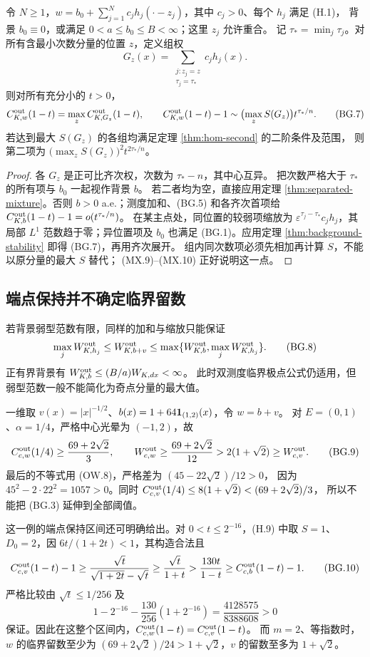 \begin{corollary}[允许奇点重合的有限混合权]\label{cor:grouped-singularities}
令 $N\ge1$，$w=b_0+\sum_{j=1}^N c_jh_j(\cdot-z_j)$，其中 $c_j>0$、每个 $h_j$ 满足 (H.1)，
背景 $b_0\equiv0$，或满足 $0<a\le b_0\le B<\infty$；这里 $z_j$ 允许重合。
记 $\tau_* =\min_j\tau_j$。对所有含最小次数分量的位置 $z$，定义组权
\[G_z(x)=\sum_{\substack{j:z_j=z\\\tau_j=\tau_*}}c_jh_j(x).
\tag{BG.6}\]
则对所有充分小的 $t>0$，
\[C^{\rm out}_{K,w}(1-t)=\max_zC^{\rm out}_{K,G_z}(1-t),\qquad
 C^{\rm out}_{K,w}(1-t)-1\sim\bigl(\max_z S(G_z)\bigr)t^{\tau_*/n}.
\tag{BG.7}\]
若达到最大 $S(G_z)$ 的各组均满足定理 \ref{thm:hom-second} 的二阶条件及范围，
则第二项为 $\bigl(\max_z S(G_z)\bigr)^2t^{2\tau_*/n}$。
\end{corollary}
\begin{proof}
各 $G_z$ 是正可比齐次权，次数为 $\tau_*-n$，其中心互异。
把次数严格大于 $\tau_*$ 的所有项与 $b_0$ 一起视作背景 $b$。
若二者均为空，直接应用定理 \ref{thm:separated-mixture}。否则 $b>0$ a.e.；测度加和、(BG.5) 和各齐次首项给
$C^{\rm out}_{K,b}(1-t)-1=o(t^{\tau_*/n})$。
在某主点处，同位置的较弱项缩放为
$\varepsilon^{\tau_j-\tau_*}c_jh_j$，其局部 $L^1$ 范数趋于零；异位置项及 $b_0$
也满足 (BG.1)。应用定理 \ref{thm:background-stability} 即得 (BG.7)，再用齐次展开。
组内同次数项必须先相加再计算 $S$，不能以原分量的最大 $S$ 替代；
(MX.9)--(MX.10) 正好说明这一点。
\end{proof}

\subsection{端点保持并不确定临界留数}\label{subsec:background-critical}
若背景弱型范数有限，同样的加和与缩放只能保证
\[\max_jW^{\rm out}_{K,h_j}\le W^{\rm out}_{K,b+v}
\le\max\{W^{\rm out}_{K,b},\max_jW^{\rm out}_{K,h_j}\}.\tag{BG.8}\]
正有界背景有 $W^{\rm out}_{K,b}\le(B/a)W_{K,dx}<\infty$。
此时双测度临界极点公式仍适用，但弱型范数一般不能简化为奇点分量的最大值。

一维取 $v(x)=|x|^{-1/2}$、$b(x)=1+64\mathbf 1_{(1,2)}(x)$，令 $w=b+v$。
对 $E=(0,1)$、$\alpha=1/4$，严格中心光晕为 $(-1,2)$，故
\[C^{\rm out}_{c,w}(1/4)\ge\frac{69+2\sqrt2}{3},\qquad
 W^{\rm out}_{c,w}\ge\frac{69+2\sqrt2}{12}
 >2(1+\sqrt2)\ge W^{\rm out}_{c,v}.\tag{BG.9}\]
最后的不等式用 (OW.8)，严格差为 $(45-22\sqrt2)/12>0$，
因为 $45^2-2\cdot22^2=1057>0$。同时
$C^{\rm out}_{c,v}(1/4)\le8(1+\sqrt2)<(69+2\sqrt2)/3$，
所以不能把 (BG.3) 延伸到全部阈值。

这一例的端点保持区间还可明确给出。对 $0<t\le2^{-16}$，(H.9) 中取
$S=1$、$D_0=2$，因 $6t/(1+2t)<1$，其构造合法且
\[C^{\rm out}_{c,v}(1-t)-1
\ge\frac{\sqrt t}{\sqrt{1+2t}-\sqrt t}
\ge\frac{\sqrt t}{1+t}
>\frac{130t}{1-t}\ge C^{\rm out}_{c,b}(1-t)-1.\tag{BG.10}\]
严格比较由 $\sqrt t\le1/256$ 及
\[1-2^{-16}-\frac{130}{256}(1+2^{-16})
=\frac{4128575}{8388608}>0\]
保证。因此在这整个区间内，$C^{\rm out}_{c,w}(1-t)=C^{\rm out}_{c,v}(1-t)$。
而 $m=2$、等指数时，$w$ 的临界留数至少为
$(69+2\sqrt2)/24>1+\sqrt2$，$v$ 的留数至多为 $1+\sqrt2$。

